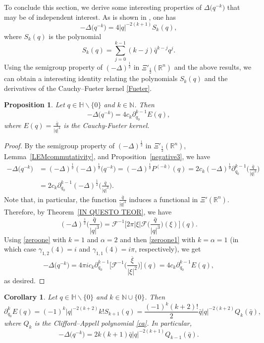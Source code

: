 \documentclass[reqno,11pt]{amsart}
\newtheorem{proposition}[theorem]{Proposition}
\newtheorem{corollary}[theorem]{Corollary}
\theoremstyle{definition}
\def\R{\mathbb{R}}
\begin{document}
To conclude this section, we derive some interesting properties of $\Delta\big(q^{-k}\big)$ that may be of independent interest. As is shown in \cite[Remark 8.6]{CDSm}, one has
\begin{equation}
	\label{EQlalppolynomial}
-\Delta\big(q^{-k}\big) = 4|q|^{-2(k+1)} S_k(q),
\end{equation}
where $S_k(q)$ is the polynomial
\[
S_k(q) = \sum_{j=0}^{k-1} (k-j)\bar{q}^{k-j}q^j.
\]
Using the semigroup property of $(-\Delta)^\frac{1}{2}$ in $\Xi'_{\frac{1}{2}}(\R^n)$ and the above results, we can obtain a interesting identity relating the polynomials $S_k(q)$ and the derivatives of the Cauchy--Fueter kernel \eqref{Fueter}.
\begin{proposition}
	\label{oneN}
	Let $q \in \mathbb{H}\backslash \{0\}$ and $k\in \mathbb{N}$. Then
	\begin{equation}
		\label{oneN1}
		-\Delta \big(q^{-k}\big)= 4c_k\partial_{q_0}^{k-1}E(q),
	\end{equation}
	where $E(q)=\frac{\bar q}{|q|^4}$ is the Cauchy-Fueter kernel.
\end{proposition}
\begin{proof}
	By the semigroup property of $(-\Delta)^\frac{1}{2}$ in $\Xi'_{\frac{1}{2}}(\R^n)$,  Lemma~\ref{LEMcommutativity}, and Proposition~\ref{negative3}, we have
	\begin{align*}
	-\Delta \big(q^{-k}\big) &= (-\Delta)^\frac{1}{2} (-\Delta)^\frac{1}{2}  \big(q^{-k}\big)  =  (-\Delta)^\frac{1}{2} P^{(-k)}(q) = 2c_k(-\Delta)^\frac{1}{2}  \partial_{q_0}^{k-1}\bigg( \frac{\bar{q}}{|q|^{3}}\bigg)\\
	& = 2c_k \partial_{q_0}^{k-1} (-\Delta)^\frac{1}{2}\bigg(  \frac{\bar{q}}{|q|^{3}}\bigg).
	\end{align*}
	Note that, in particular, the function $\frac{\bar{q}}{|q|^3}$ induces a functional in $\Xi'(\R^n)$. Therefore, by Theorem~\ref{IN QUESTO TEOR}, we have
	\[
	(-\Delta)^\frac{1}{2}\bigg(  \frac{\bar{q}}{|q|^{3}}\bigg)  =  \mathcal{F}^{-1} \bigg[ 2\pi |\xi| \mathcal{F} \bigg( \frac{\bar{q}}{|q|^{3}}\bigg)(\xi) \bigg](q).
	\]
	Using \eqref{zeroone} with $k=1$ and $\alpha=2$ and then \eqref{zeroone1} with $k=\alpha=1$ (in which case $\gamma_{1,2}(4)=i$ and $\gamma_{1,1}(4)=i\pi$, respectively), we get
	\[
	-\Delta \big(q^{-k}\big)=4 \pi i c_k \partial_{q_0}^{k-1} \bigg[ \mathcal{F}^{-1} \bigg(\frac{\overline{\xi}}{| \xi|^2}\bigg)\bigg](q)=4c_k  \partial_{q_0}^{k-1}E(q),
	\]
	as desired.
\end{proof}
\begin{corollary}
	Let $q \in \mathbb{H}\backslash \{0\}$ and $k\in \mathbb{N}\cup\{0\}$. Then
	\begin{equation}
		\label{EQlaplacianidentity}
	\partial_{q_0}^{k}E(q)  = (-1)^{k}|q|^{-2(k+2)}k!  S_{k+1}(q) = \frac{(-1)^k (k+2)!}{2}\bar{q}|q|^{-2(k+2)} Q_k(\bar{q}) ,
	\end{equation}
	where $Q_k$ is the Clifford--Appell polynomial  \eqref{ca}. In particular,
	\[
	-\Delta \big(q^{-k}\big)= 2 k(k+1) \bar{q}|q|^{-2(k+1)}Q_{k-1}(\bar{q}).
	\]
\end{corollary}
\end{document}
